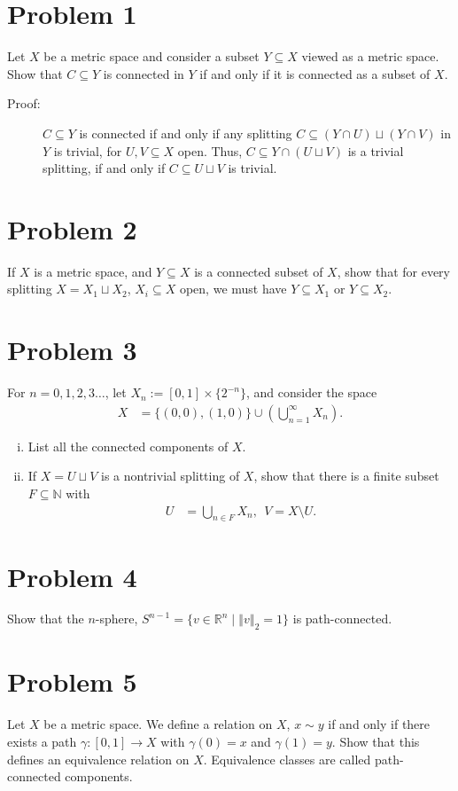 \documentclass[8pt]{extarticle}
\title{}
\author{}
\date{}
\newcommand{\N}{\mathbb{N}}
\newcommand{\R}{\mathbb{R}}
\newcommand{\norm}[1]{\left\Vert #1\right\Vert}
\begin{document}
  \section{Problem 1}%
  Let $X$ be a metric space and consider a subset $Y\subseteq X$ viewed as a metric space. Show that $C\subseteq Y$ is connected in $Y$ if and only if it is connected as a subset of $X$.
  \begin{description}
    \item[Proof:] $C\subseteq Y$ is connected if and only if any splitting $C\subseteq (Y\cap U)\sqcup(Y\cap V)$ in $Y$ is trivial, for $U,V\subseteq X$ open. Thus, $C\subseteq Y\cap (U\sqcup V)$ is a trivial splitting, if and only if $C\subseteq U\sqcup V$ is trivial.
  \end{description}
  \section{Problem 2}%
  If $X$ is a metric space, and $Y\subseteq X$ is a connected subset of $X$, show that for every splitting $X = X_1\sqcup X_2$, $X_i\subseteq X$ open, we must have $Y\subseteq X_1$ or $Y\subseteq X_2$.
  \section{Problem 3}%
  For $n=0,1,2,3\dots$, let $X_n := [0,1]\times \{2^{-n}\}$, and consider the space
  \begin{align*}
    X &= \{(0,0),(1,0)\} \cup \left(\bigcup_{n=1}^{\infty} X_n\right).
  \end{align*}
  \begin{enumerate}[(i)]
    \item List all the connected components of $X$.
    \item If $X = U\sqcup V$ is a nontrivial splitting of $X$, show that there is a finite subset $F\subseteq \N$ with
      \begin{align*}
        U &= \bigcup_{n\in F}X_n,~~V = X\setminus U.
      \end{align*}
  \end{enumerate}
  \section{Problem 4}%
  Show that the $n$-sphere, $S^{n-1} = \{v\in \R^n\mid \norm{v}_2 = 1\}$ is path-connected.
  \section{Problem 5}%
  Let $X$ be a metric space. We define a relation on $X$, $x\sim y$ if and only if there exists a path $\gamma: [0,1] \rightarrow X$ with $\gamma(0) = x$ and $\gamma(1) = y$. Show that this defines an equivalence relation on $X$. Equivalence classes are called path-connected components.
\end{document}
